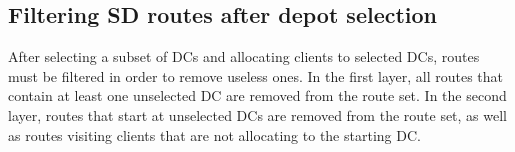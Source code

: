 \documentclass[a4paper,10pt]{article}
\begin{document}
\begin{linenumbers}
\newpage

\subsection{Filtering SD routes after depot selection}

After selecting a subset of DCs and allocating clients to selected DCs, routes must be filtered in order to remove useless ones. 
In the first layer, all routes that contain at least one unselected DC are removed from the route set. 
In the second layer, routes that start at unselected DCs are removed from the route set, as well as routes visiting clients that are not allocating to the starting DC. 


%
%		
%		
%
%
%
%
%		
%				




\end{linenumbers}
\end{document}
